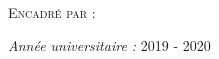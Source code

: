 \begin{titlepage}
\begin{rmfamily}
\begin{center}
      \HRule \\[1cm]
      \begin{minipage}{0.6\textwidth}
        \begin{flushleft} \large
          \textsc{Encadré par :} \mentor{} \\

        \end{flushleft}
      \end{minipage}
      \newline \vskip4cm


      \vfill

      {\large \emph{Année universitaire : } 2019 - 2020}

    \end{center}
  \end{rmfamily}
  \thispagestyle{empty}
\end{titlepage}
